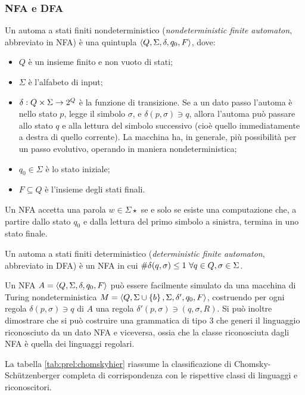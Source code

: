 \subsubsection{NFA e DFA}
\begin{defin}
	Un automa a stati finiti nondeterministico (\emph{nondeterministic finite automaton}, abbreviato in NFA) è una quintupla $\langle Q,\Sigma,\delta,q_0,F \rangle$, dove:
	\begin{itemize}
		\item $Q$ è un insieme finito e non vuoto di stati;
		\item $\Sigma$ è l'alfabeto di input;
		\item $\delta:Q\times\Sigma\to2^{Q}$ è la funzione di transizione. Se a un dato passo l'automa è nello stato $p$, legge il simbolo $\sigma$, e $\delta(p,\sigma)\ni q$, allora l'automa può passare allo stato $q$ e alla lettura del simbolo successivo (cioè quello immediatamente a destra di quello corrente). La macchina ha, in generale, più possibilità per un passo evolutivo, operando in maniera nondeterministica;
		\item $q_0\in\Sigma$ è lo stato iniziale;
		\item $F\subseteq Q$ è l'insieme degli stati finali.
	\end{itemize}
	Un NFA accetta una parola $w\in\Sigma\star$ se e solo se esiste una computazione che, a partire dallo stato $q_0$ e dalla lettura del primo simbolo a sinistra, termina in uno stato finale.
\end{defin}
\begin{defin}
	Un automa a stati finiti deterministico (\emph{deterministic finite automaton}, abbreviato in DFA) è un NFA in cui $\# \delta(q,\sigma)\leq 1 ~ \forall q\in Q,\sigma\in\Sigma$.
\end{defin}

Un NFA $A=\langle Q,\Sigma,\delta,q_0,F \rangle$ può essere facilmente simulato da una macchina di Turing nondeterministica $M=\langle Q,\Sigma\cup\left\{ b \right\},\Sigma,\delta',q_0,F \rangle$, costruendo per ogni regola $\delta(p,\sigma)\ni q$ di $A$ una regola $\delta'(p,\sigma)\ni (q,\sigma,R)$. Si può inoltre dimostrare che si può costruire una grammatica di tipo 3 che generi il linguaggio riconosciuto da un dato NFA e viceversa, ossia che la classe riconosciuta dagli NFA è quella dei linguaggi regolari.

La tabella \ref{tab:prel:chomskyhier} riassume la classificazione di Chomsky-Schützenberger completa di corrispondenza con le rispettive classi di linguaggi e riconoscitori.

